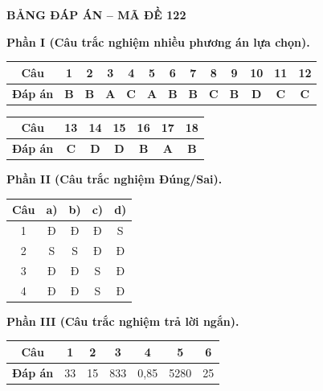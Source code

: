 \vspace{0.4cm}
\noindent\begin{minipage}{\linewidth}
\begin{center}{\large\bfseries\color{red!80!black} BẢNG ĐÁP ÁN -- MÃ ĐỀ 122}\end{center}
\vspace{0.15cm}
\noindent\textbf{Phần I (Câu trắc nghiệm nhiều phương án lựa chọn).}\par\smallskip
\begin{center}
\begin{tabular}{|c|c|c|c|c|c|c|c|c|c|c|c|c|}\hline
\textbf{Câu} & 1 & 2 & 3 & 4 & 5 & 6 & 7 & 8 & 9 & 10 & 11 & 12 \\ \hline
\textbf{Đáp án} & \textbf{B} & \textbf{B} & \textbf{A} & \textbf{C} & \textbf{A} & \textbf{B} & \textbf{B} & \textbf{C} & \textbf{B} & \textbf{D} & \textbf{C} & \textbf{C} \\ \hline
\end{tabular}
\end{center}
\begin{center}
\begin{tabular}{|c|c|c|c|c|c|c|}\hline
\textbf{Câu} & 13 & 14 & 15 & 16 & 17 & 18 \\ \hline
\textbf{Đáp án} & \textbf{C} & \textbf{D} & \textbf{D} & \textbf{B} & \textbf{A} & \textbf{B} \\ \hline
\end{tabular}
\end{center}
\noindent\textbf{Phần II (Câu trắc nghiệm Đúng/Sai).}\par\smallskip
\begin{center}
\begin{tabular}{|c|c|c|c|c|}\hline
\textbf{Câu} & \textbf{a)} & \textbf{b)} & \textbf{c)} & \textbf{d)} \\ \hline
1 & Đ & Đ & Đ & S \\ \hline
2 & S & S & Đ & Đ \\ \hline
3 & Đ & Đ & S & Đ \\ \hline
4 & Đ & Đ & S & Đ \\ \hline
\end{tabular}
\end{center}
\noindent\textbf{Phần III (Câu trắc nghiệm trả lời ngắn).}\par\smallskip
\begin{center}
\begin{tabular}{|c|c|c|c|c|c|c|}\hline
\textbf{Câu} & 1 & 2 & 3 & 4 & 5 & 6 \\ \hline
\textbf{Đáp án} & 33 & 15 & 833 & 0,85 & 5280 & 25 \\ \hline
\end{tabular}
\end{center}
\end{minipage}
